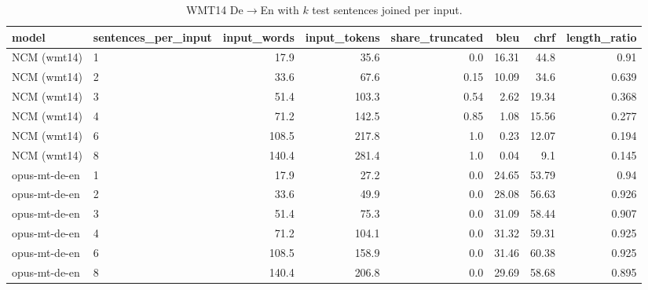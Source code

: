 \begin{table}[t]
\centering\small
\caption{WMT14 De$\rightarrow$En with $k$ test sentences joined per input.}
\label{tab:input_length}
\begin{tabular}{llrrrrrr}
\toprule
model & sentences\_per\_input & input\_words & input\_tokens & share\_truncated & bleu & chrf & length\_ratio \\
\midrule
NCM (wmt14) & 1 & 17.9 & 35.6 & 0.0 & 16.31 & 44.8 & 0.91 \\
NCM (wmt14) & 2 & 33.6 & 67.6 & 0.15 & 10.09 & 34.6 & 0.639 \\
NCM (wmt14) & 3 & 51.4 & 103.3 & 0.54 & 2.62 & 19.34 & 0.368 \\
NCM (wmt14) & 4 & 71.2 & 142.5 & 0.85 & 1.08 & 15.56 & 0.277 \\
NCM (wmt14) & 6 & 108.5 & 217.8 & 1.0 & 0.23 & 12.07 & 0.194 \\
NCM (wmt14) & 8 & 140.4 & 281.4 & 1.0 & 0.04 & 9.1 & 0.145 \\
opus-mt-de-en & 1 & 17.9 & 27.2 & 0.0 & 24.65 & 53.79 & 0.94 \\
opus-mt-de-en & 2 & 33.6 & 49.9 & 0.0 & 28.08 & 56.63 & 0.926 \\
opus-mt-de-en & 3 & 51.4 & 75.3 & 0.0 & 31.09 & 58.44 & 0.907 \\
opus-mt-de-en & 4 & 71.2 & 104.1 & 0.0 & 31.32 & 59.31 & 0.925 \\
opus-mt-de-en & 6 & 108.5 & 158.9 & 0.0 & 31.46 & 60.38 & 0.925 \\
opus-mt-de-en & 8 & 140.4 & 206.8 & 0.0 & 29.69 & 58.68 & 0.895 \\
\bottomrule
\end{tabular}
\end{table}
